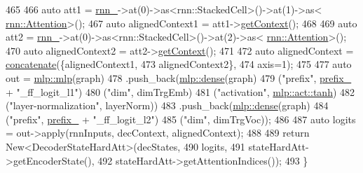 \begin{DoxyCode}
465 
466     \textcolor{keyword}{auto} att1 = \hyperlink{classmarian_1_1DecoderHardSoftAtt_ae077a0f8f32a457c0c2c972ca4251ede}{rnn\_}->at(0)->as<rnn::StackedCell>()->at(1)->as<
      \hyperlink{namespacemarian_1_1rnn_ae9586d2236bd64dae0a644c58d9fc76e}{rnn::Attention}>();
467     \textcolor{keyword}{auto} alignedContext1 = att1->\hyperlink{classmarian_1_1rnn_1_1GlobalAttention_ad518e4c82f56b8f95393dffa2df2288b}{getContext}();
468 
469     \textcolor{keyword}{auto} att2 = \hyperlink{classmarian_1_1DecoderHardSoftAtt_ae077a0f8f32a457c0c2c972ca4251ede}{rnn\_}->at(0)->as<rnn::StackedCell>()->at(2)->as<
      \hyperlink{namespacemarian_1_1rnn_ae9586d2236bd64dae0a644c58d9fc76e}{rnn::Attention}>();
470     \textcolor{keyword}{auto} alignedContext2 = att2->\hyperlink{classmarian_1_1rnn_1_1GlobalAttention_ad518e4c82f56b8f95393dffa2df2288b}{getContext}();
471 
472     \textcolor{keyword}{auto} alignedContext = \hyperlink{namespacemarian_a2791a2c8f79a938f5cb22ae613680675}{concatenate}(\{alignedContext1,
473                                        alignedContext2\},
474                                        axis=1);
475 
477     \textcolor{keyword}{auto} out = \hyperlink{namespacemarian_1_1mlp_a4d0fe240d31bdc33bcbdb5401de49e27}{mlp::mlp}(graph)
478                .push\_back(\hyperlink{namespacemarian_1_1mlp_a8c25b1e343bf78e66cd9e33e607efeb5}{mlp::dense}(graph)
479                           (\textcolor{stringliteral}{"prefix"}, \hyperlink{classmarian_1_1DecoderBase_a043a90801b6bda9a45e309607136e947}{prefix\_} + \textcolor{stringliteral}{"\_ff\_logit\_l1"})
480                           (\textcolor{stringliteral}{"dim"}, dimTrgEmb)
481                           (\textcolor{stringliteral}{"activation"}, \hyperlink{namespacemarian_1_1mlp_ac16d27a877d16d7394f2057aee439d72a5c0dbba3a6ee4ac0eb26cfee75ccb8b4}{mlp::act::tanh})
482                           (\textcolor{stringliteral}{"layer-normalization"}, layerNorm))
483                .push\_back(\hyperlink{namespacemarian_1_1mlp_a8c25b1e343bf78e66cd9e33e607efeb5}{mlp::dense}(graph)
484                           (\textcolor{stringliteral}{"prefix"}, \hyperlink{classmarian_1_1DecoderBase_a043a90801b6bda9a45e309607136e947}{prefix\_} + \textcolor{stringliteral}{"\_ff\_logit\_l2"})
485                           (\textcolor{stringliteral}{"dim"}, dimTrgVoc));
486 
487     \textcolor{keyword}{auto} logits = out->apply(rnnInputs, decContext, alignedContext);
488 
489     \textcolor{keywordflow}{return} New<DecoderStateHardAtt>(decStates,
490                                     logits,
491                                     stateHardAtt->getEncoderState(),
492                                     stateHardAtt->getAttentionIndices());
493   \}
\end{DoxyCode}


